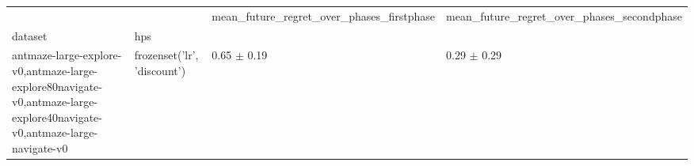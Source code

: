\begin{tabular}{llll}
\toprule
 &  & mean_future_regret_over_phases_firstphase & mean_future_regret_over_phases_secondphase \\
dataset & hps &  &  \\
\midrule
antmaze-large-explore-v0,antmaze-large-explore80navigate-v0,antmaze-large-explore40navigate-v0,antmaze-large-navigate-v0 & frozenset({'lr', 'discount'}) & 0.65 $\pm$ 0.19 & 0.29 $\pm$ 0.29 \\
\cline{1-4}
\bottomrule
\end{tabular}
